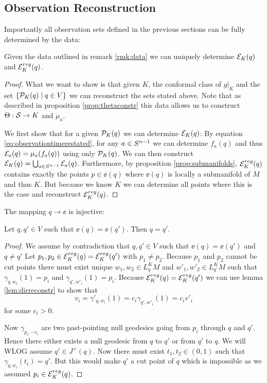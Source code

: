 \subsection{Observation Reconstruction}
Importantly all observation sets defined in the previous sections can be fully determined by the data:
\begin{proposition}\label{prop:obsreconstr}
    Given the data outlined in remark \ref{rmk:data} we can uniquely determine ${\mathcal{E}}_K(q)$ and ${\mathcal{E}}^{reg}_K(q)$.
\end{proposition}
\begin{proof}
    What we want to show is that given $K$, the conformal class of $g\rvert_{K}$ and the set $\{{{\mathcal{P}}_K(q)} \mid q\in V\}$ we can reconstruct the sets stated above. Note that as described in proposition \ref{prop:thetaconstr} this data allows us to construct $\Theta:{\mathcal{S}}\to K$ and $\mu_a$.

    We first show that for a given ${\mathcal{P}}_K(q)$ we can determine ${\mathcal{E}}_K(q)$: By equation \eqref{eq:observationtimerestated}, for any $a\in {S^{n-1}}$ we can determine $f_a(q)$ and thus ${\mathcal{E}}_a(q)=\mu_a(f_a(q))$ using only ${{\mathcal{P}}_K(q)}$. We can then construct ${\mathcal{E}}_K(q) = \bigcup_{a\in {S^{n-1}}} {\mathcal{E}}_a(q)$. Furthermore, by proposition \ref{prop:submanifolds}, ${{\mathcal{E}}^{reg}_K}(q)$ contains exactly the points $p\in \ee(q)$ where $\ee(q)$ is locally a submanifold of $M$ and thus $K$. But because we know $K$ we can determine all points where this is the case and reconstruct ${{\mathcal{E}}^{reg}_K}(q)$. 
\end{proof}

The mapping $q\to \ee$ is injective:
\begin{proposition}\label{prop:einj}
    Let $q,q'\in V$ such that $\ee(q)=\ee(q')$. Then $q=q'$.
\end{proposition}
\begin{proof}
    We assume by contradiction that $q,q'\in V$ such that $\ee(q)=\ee(q')$ and $q\neq q'$
    Let $p_1, p_2 \in {{\mathcal{E}}^{reg}_K}(q)={{\mathcal{E}}^{reg}_K}(q')$ with $p_1\neq p_2$. Because $p_1$ and $p_2$ cannot be cut points there must exist unique $w_1,w_2\in L^K_qM$ and $w'_1,w'_2\in L^K_{q'}M$ such that $\gamma_{q,w_i}(1)=p_i$ and $\gamma_{q',w'_i}(1)=p_i$. Because ${{\mathcal{E}}^{reg}_K}(q)={{\mathcal{E}}^{reg}_K}(q')$ we can use lemma \ref{lem:dirreconstr} to show that 
    \[
        v_i = \gamma'_{q,w_i}(1) = c_i\gamma_{q',w'_i}(1)=c_iv'_i
    \] for some $c_i>0$.

    Now $\gamma_{p_i,-v_i}$ are two past-pointing null geodesics going from $p_i$ through $q$ and $q'$. Hence there either exists a null geodesic from $q$ to $q'$ or from $q'$ to $q$. We will WLOG assume $q'\in J^+(q)$. 
    Now there must exist $t_1, t_2 \in (0,1)$ such that $\gamma_{q,w_i}(t_i)=q'$. But this would make $q'$ a cut point of $q$ which is impossible as we assumed $p_i\in {{\mathcal{E}}^{reg}_K}(q)$.
\end{proof}


